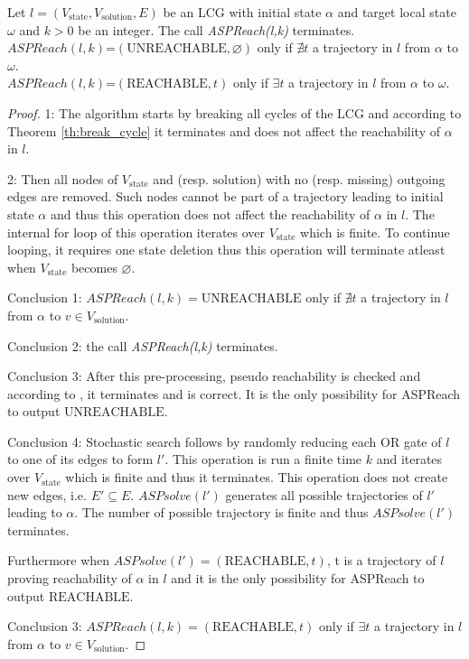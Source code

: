\documentclass{entcs}
\begin{document}
\begin{theorem}
    
    Let $l=(V_{\mathrm{state}}, V_{\mathrm{solution}}, E)$ be an LCG with initial state $\alpha$ and target local state $\omega$ and $k > 0$ be an integer.
    The call \textit{ASPReach(l,k)} terminates.\\
    $ASPReach(l,k)$=$(\mathrm{UNREACHABLE},\varnothing)$ only if $\nexists t$ a trajectory in $l$ from $\alpha$ to $\omega$.\\
    $ASPReach(l,k)$=$(\mathrm{REACHABLE},t)$ only if $\exists t$ a trajectory in $l$ from $\alpha$ to $\omega$.
    \begin{proof}
    
        1: The algorithm starts by breaking all cycles of the LCG and according to Theorem \ref{th:break_cycle} it terminates and does not affect the reachability of $\alpha$ in $l$.
        
        2: Then all nodes of $V_{\mathrm{state}}$ and (resp. ${\mathrm{solution}}$) with no (resp. missing) outgoing edges are removed.
        Such nodes cannot be part of a trajectory leading to initial state $\alpha$ and thus this operation does not affect the reachability of $\alpha$ in $l$.
        The internal for loop of this operation iterates over $V_{\mathrm{state}}$ which is finite.
        To continue looping, it requires one state deletion thus this operation will terminate atleast when $V_{\mathrm{state}}$ becomes $\varnothing$.
        
        Conclusion 1: $ASPReach(l,k)=\mathrm{UNREACHABLE}$ only if $\nexists t$ a trajectory in $l$ from $\alpha$ to $v \in V_{\mathrm{solution}}$.
        
        Conclusion 2: the call \textit{ASPReach(l,k)} terminates.
        
        Conclusion 3: After this pre-processing, pseudo reachability is checked and according to \cite{pauleve2012}, it terminates and is correct.
        It is the only possibility for ASPReach to output $\mathrm{UNREACHABLE}$.
        
        Conclusion 4: Stochastic search follows by randomly reducing each OR gate of $l$ to one of its edges to form $l'$.
        This operation is run a finite time $k$ and iterates over $V_{\mathrm{state}}$ which is finite and thus it terminates.
        This operation does not create new edges, i.e. $E' \subseteq E$.
        $ASPsolve(l')$ generates all possible trajectories of $l'$ leading to $\alpha$.
        The number of possible trajectory is finite and thus $ASPsolve(l')$ terminates.
        
        
        
        Furthermore when $ASPsolve(l')=(\mathrm{REACHABLE},t)$, t is a trajectory of $l$ proving reachability of $\alpha$ in $l$ and it is the only possibility for ASPReach to output $\mathrm{REACHABLE}$.
        
        Conclusion 3: $ASPReach(l,k)=(\mathrm{REACHABLE},t)$ only if $\exists t$ a trajectory in $l$ from $\alpha$ to $v \in V_{\mathrm{solution}}$.
        
    \end{proof}
\end{theorem}
\end{document}
